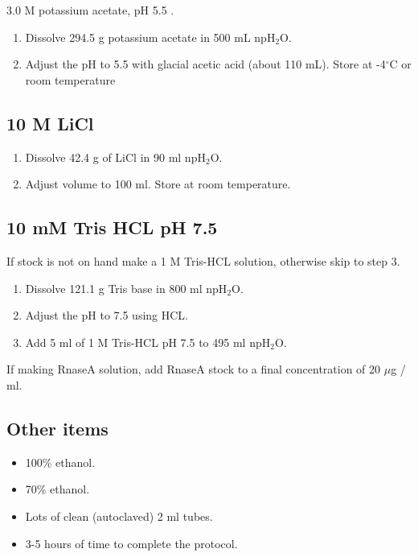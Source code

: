 \documentclass[12pt]{article}
\theoremstyle{definition}
\begin{document}
3.0 M potassium acetate, pH 5.5 .

\begin{enumerate}
	\item Dissolve 294.5 g potassium acetate in 500 mL npH$_2$O.
	\item Adjust the pH to 5.5 with glacial acetic acid (about 110 mL). Store at -4$^{\circ}$C or room temperature
\end{enumerate}

\subsection*{10 M LiCl}
\label{sec:licl}

\begin{enumerate}
	\item Dissolve 42.4 g of LiCl in 90 ml npH$_2$O.
	\item Adjust volume to 100 ml. Store at room temperature.
\end{enumerate}

\subsection*{10 mM Tris HCL pH 7.5}
\label{sec:tris}

If stock is not on hand make a 1 M Tris-HCL solution, otherwise skip to step 3.

\begin{enumerate}
	\item Dissolve 121.1 g Tris base in 800 ml npH$_2$O.
	\item Adjust the pH to 7.5 using HCL.
	\item Add 5 ml of 1 M Tris-HCL pH 7.5 to 495 ml npH$_2$O.
\end{enumerate}

If making RnaseA solution, add RnaseA stock to a final concentration of 20 $\mu$g / ml. 


\subsection*{Other items}

\begin{itemize}
	\item 100\% ethanol.
	\item 70\% ethanol.
	\item Lots of clean (autoclaved) 2 ml tubes.
	\item 3-5 hours of time to complete the protocol.
\end{itemize}
\end{document}
